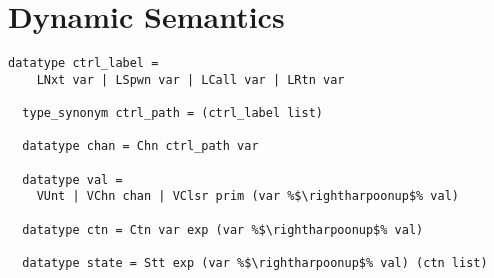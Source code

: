 \documentclass{article}
\begin{document}
\section{Dynamic Semantics}


\begin{lstlisting}[style=codestyle1, escapechar=\%]
  datatype ctrl_label = 
    LNxt var | LSpwn var | LCall var | LRtn var

  type_synonym ctrl_path = (ctrl_label list)

  datatype chan = Chn ctrl_path var

  datatype val = 
    VUnt | VChn chan | VClsr prim (var %$\rightharpoonup$% val)

  datatype ctn = Ctn var exp (var %$\rightharpoonup$% val)  

  datatype state = Stt exp (var %$\rightharpoonup$% val) (ctn list) 

  \end{lstlisting}
\end{document}
